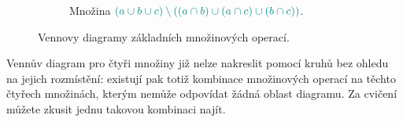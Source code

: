 \begin{figure}[ht]
\begin{subfigure}[b]{.54\textwidth}
    \caption{Množina $\clc{(a \cup b \cup c) \setminus ((a \cap b) \cup (a \cap
    c) \cup (b \cap c))}$.}
  \end{subfigure}
  \caption{Vennovy diagramy základních množinových operací.}
  \label{fig:vennuv-diagram-tri-2}
\end{figure}

Vennův diagram pro čtyři množiny již nelze nakreslit pomocí kruhů bez ohledu na
jejich rozmístění: existují pak totiž kombinace množinových operací na těchto
čtyřech množinách, kterým nemůže odpovídat žádná oblast diagramu. Za cvičení
můžete zkusit jednu takovou kombinaci najít.

